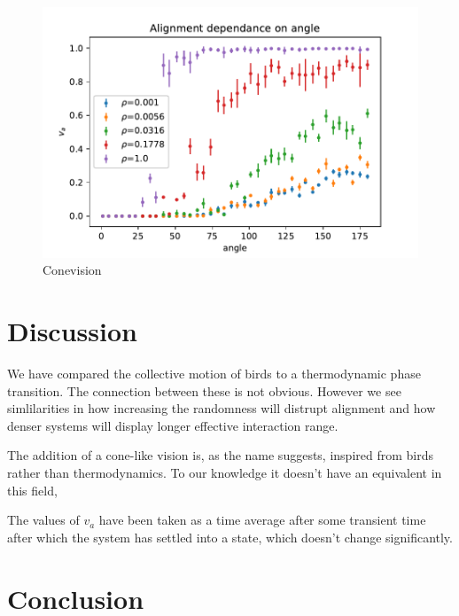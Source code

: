 \documentclass[twoside,twocolumn]{article}
\begin{document}
\begin{figure}[!htb]
\label{fig:conevision}
  \begin{center}
    \includegraphics[width=\columnwidth]{va_over_angle}
  \end{center}
  \caption{Conevision}
\end{figure}


\section{Discussion}


We have compared the collective motion of birds to a thermodynamic phase transition. The connection between these is not obvious. However we see simlilarities in how increasing the randomness will distrupt alignment and how denser systems will display longer effective interaction range.

The addition of a cone-like vision is, as the name suggests, inspired from birds rather than thermodynamics. To our knowledge it doesn't have an equivalent in this field, 

The values of $v_a$ have been taken as a time average after some transient time after which the system has settled into a state, which doesn't change significantly.




\section{Conclusion}
\end{document}
